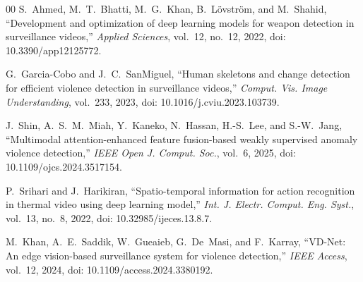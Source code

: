 \documentclass[conference]{IEEEtran}
\begin{document}
\begin{thebibliography}{00}
 S.~Ahmed, M.~T.~Bhatti, M.~G.~Khan, B.~L\"{o}vstr\"{o}m, and M.~Shahid, ``Development and optimization of deep learning models for weapon detection in surveillance videos,'' \textit{Applied Sciences}, vol.~12, no.~12, 2022, doi: 10.3390/app12125772.

 G.~Garcia-Cobo and J.~C.~SanMiguel, ``Human skeletons and change detection for efficient violence detection in surveillance videos,'' \textit{Comput. Vis. Image Understanding}, vol.~233, 2023, doi: 10.1016/j.cviu.2023.103739.

 J.~Shin, A.~S.~M.~Miah, Y.~Kaneko, N.~Hassan, H.-S.~Lee, and S.-W.~Jang, ``Multimodal attention-enhanced feature fusion-based weakly supervised anomaly violence detection,'' \textit{IEEE Open J. Comput. Soc.}, vol.~6, 2025, doi: 10.1109/ojcs.2024.3517154.

 P.~Srihari and J.~Harikiran, ``Spatio-temporal information for action recognition in thermal video using deep learning model,'' \textit{Int. J. Electr. Comput. Eng. Syst.}, vol.~13, no.~8, 2022, doi: 10.32985/ijeces.13.8.7.

 M.~Khan, A.~E.~Saddik, W.~Gueaieb, G.~De~Masi, and F.~Karray, ``VD-Net: An edge vision-based surveillance system for violence detection,'' \textit{IEEE Access}, vol.~12, 2024, doi: 10.1109/access.2024.3380192.

\end{thebibliography}
\end{document}
